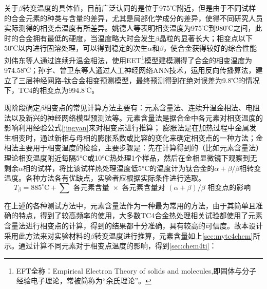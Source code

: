 关于$\beta$转变温度的具体值，目前广泛认同的是位于975℃附近，但是由于不同试样的合金元素的种类与含量的差异，尤其是局部化学成分的差异，使得不同研究人员实际测得的相变点温度有所差异\cite{wangtaoTC4hejinxiangbianwendujiancezhongjieguobuyizhiyuanyinfenxi2013}。姚德人等\cite{yaoderenTc4taihejinxiangbiandiandeceding1975}表明相变温度为975℃到980℃之间，此时的合金拥有最低的硬度，当温度略大时会发生$\beta$晶粒的显著长大；相变点以下50℃以内进行固溶处理，可以得到稳定的次生$ \alpha$和$ \beta $，使合金获得较好的综合性能%
刘伟东等人\cite{liuweidongTC4hejinVzhuanbianwendudejinxiangfacedingyulilunjisuan2014}通过连续升温金相法，使用EET\footnote{EFT全称：Empirical Electron Theory of solids and molecules,即固体与分子经验电子理论，常被简称为“余氏理论”。}模型建模测得了\ti 合金的相变温度为974.58℃；孙宇、曾卫东等人\cite{sunyuYingyongrengongshenjingwangluoyanjiuhuaxueyuansuduitaihejinxiangbiandiandeyingxiang2010}通过人工神经网络ANN技术，运用反向传播算法，建立了三层神经网路-钛合金相变预测模型，最终预测得到在绝对误差为9.8℃的情况下，TC4的相变点为994.8℃。

现阶段确定$ \beta $相变点的常见计算方法\cite{zhuhongTaihejinaVxiangbiandiandejizhongceshifangfatantao2013}主要有：元素含量法、连续升温金相法、电阻法以及新兴的神经网络模型预测法\cite{renchiqiangGurongshixiaoduiTC4taihejinxianweizuzhihelixuexingnengdeyingxiang2022}等。元素含量法是据合金中各元素对相变温度的影响\cite{ananyaLocationBasedIntelligent2011}利用经验公式\ref{jingyan}来对相变点进行推算；%
膨胀法是在加热过程中金属发生相变时，通过新相与母相的膨胀系数或比容的变化来确定相变点的一种方法；金相法主要用于相变温度的检验，主要步骤是：先在计算得到的（比如元素含量法）理论相变温度附近每隔5°C或10°C热处理1个样品，然后在金相显微镜下观察到无剩余$\alpha$相的试样，将比该试样热处理温度低5°C的温度计为钛合金的$\alpha+\beta/\beta$相转变温度。各种方法各有优缺点，实验者应根据实际条件进行选取。
\begin{equation}
	T_\beta=885^{\circ} \mathrm{C}+\sum \textit{ 各元素含量 } \times \textit{ 各元素含量对 }(\alpha+\beta) / \beta \textit{ 相变点的影响 }
	\label{jingyan}
\end{equation}

在上述的各种测试方法中，元素含量法作为一种最为常用的方法，由于其简单且准确的特点，得到了较高频率的使用，大多数TC4合金热处理相关试验都使用了元素含量法进行相变点的计算\cite{LiuLeiTi6Al4VTaiHeJinBuTongReChuLiFangFaDeShiYanYuFuHeCaiLiaoLiXueXingNengFenXi2022,zouhaibeiTC4taihejinrechuliqianghuagongyijixiangbianhangweiyanjiu2019,liutaoRechuliduiTC4taihejindongtailixuexingnengheweiguanzuzhideyingxiang,baoxuechunRechuligongyiduiTC4taihejinzuzhihelixuexingnengdeyingxiang2019,wangpuqiangButongrechuligongyixiajiguangzengcaizhizaoTC4taihejinzuzhiyuxingnengyanjiujinzhan2020}，得到的结果都十分准确，具有较高的可信度。故本设计采用此方法来对实验材料的$\beta$转变温度进行推算，元素含量如上\ref{sec:mytc4chem}所示。通过计算不同元素对于相变点温度的影响，得到\ref{sec:chem4ti}：

